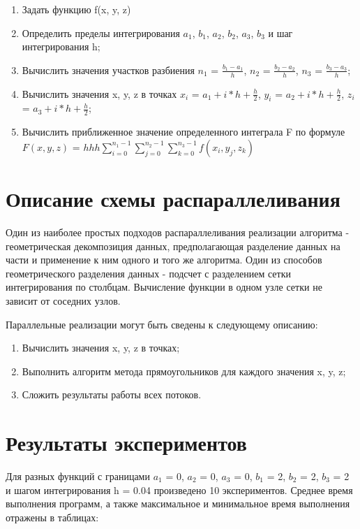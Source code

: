 \documentclass[14pt, a4paper]{extarticle}
\begin{document}
  \begin{enumerate}
    \item Задать функцию f(x, y, z)
      
     \item Определить пределы интегрирования $a_{1}$, $b_{1}$, $a_{2}$, $b_{2}$, $a_{3}$, $b_{3}$ и шаг интегрирования h;

     \item Вычислить значения участков разбиения $n_{1}$ = $\frac{b_{1} - a_{1}}{h}$, $n_{2}$ = $\frac{b_{2} - a_{2}}{h}$, $n_{3}$ = $\frac{b_{3} - a_{3}}{h}$;

     \item Вычислить значения x, y, z в точках $x_{i}$ = $a_{1} + i*h + \frac{h}{2}$, $y_{i}$ = $a_{2} + i*h + \frac{h}{2}$, $z_{i}$ = $a_{3} + i*h + \frac{h}{2}$;
     
    \item Вычислить приближенное значение определенного интеграла F по формуле
    $F(x, y, z)$ = $hhh\displaystyle\sum_{i=0}^{n_{1} - 1}\displaystyle\sum_{j=0}^{n_{2} - 1}\displaystyle\sum_{k=0}^{n_{3} - 1}f(x_{i}, y_{j}, z_{k})$
  \end{enumerate}
  \newpage

  \section{Описание схемы распараллеливания}
Один из наиболее простых подходов распараллеливания реализации алгоритма - геометрическая декомпозиция данных, предполагающая разделение данных на части и применение к ним одного и того же алгоритма. Один из способов геометрического разделения данных - подсчет с разделением сетки интегрирования по столбцам. Вычисление функции в одном узле сетки не зависит от соседних узлов.

Параллельные реализации могут быть сведены к следующему описанию:
  \begin{enumerate}
    \item Вычислить значения x, y, z в точках;
    \item Выполнить алгоритм метода прямоугольников для каждого значения x, y, z;
    \item Сложить результаты работы всех потоков.
  \end{enumerate}


  \newpage

  \section{Результаты экспериментов}
  Для разных функций с границами $a_{1}$ = 0, $a_{2}$ = 0, $a_{3}$ = 0, $b_{1}$ = 2, $b_{2}$ = 2, $b_{3}$ = 2 и шагом интегрирования h = 0.04 произведено 10 экспериментов. Среднее время выполнения программ, а также максимальное и минимальное время выполнения отражены в таблицах:
 
\end{document}
